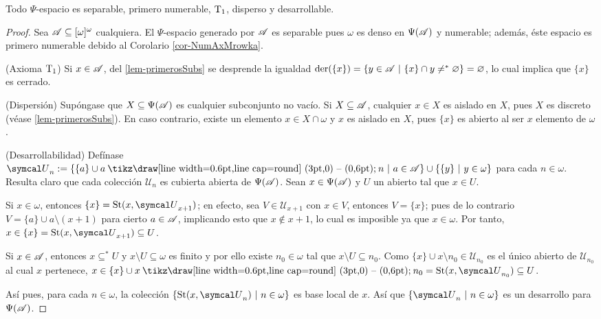  \begin{proposicion}\label{prop-PsiSiempre}
  Todo $\Psi$-espacio es separable, primero numerable, $\operatorname{T}_1$, disperso y desarrollable.
 \end{proposicion}
 
 \begin{proof} 
  Sea $\mathscr{A} \subseteq [\omega]^\omega$ cualquiera. El $\Psi$-espacio generado por $\mathscr{A}$ es separable pues $\omega$ es denso en $\Psi(\mathscr{A})$ y numerable; además, éste espacio es primero numerable debido al Corolario \ref{cor-NumAxMrowka}.
 
  (Axioma $\operatorname{T}_1$) Si $x \in \mathscr{A}$, del \autoref{lem-primerosSubs} se desprende la igualdad $\operatorname{der}(\{x\})=\{y \in \mathscr{A} \text{ $|$ } \{x\} \cap y \neq^* \varnothing \}=\varnothing$, lo cual implica que $\{x\}$ es cerrado.
  
  (Dispersión) Supóngase que $X \subseteq \Psi(\mathscr{A})$ es cualquier subconjunto no vacío. Si $X \subseteq \mathscr{A}$, cualquier $x \in X$ es aislado en $X$, pues $X$ es discreto (véase \ref{lem-primerosSubs}). En caso contrario, existe un elemento $x \in X \cap \omega$ y $x$ es aislado en $X$, pues $\{x\}$ es abierto al ser $x$ elemento de $\omega$.
  
  (Desarrollabilidad) Defínase $\mathcal{U}_n:=\{ \{a\} \cup a \setminus n \tq a \in \ms{A} \} \cup \{ \{y\} \tq y \in \omega \}$ para cada $n \in \omega$. Resulta claro que cada colección $\mathcal{U}_n$ es cubierta abierta de $\Psi(\mathscr{A})$. Sean $x \in \Psi(\mathscr{A})$ y $U$ un abierto tal que $x \in U$.
  
  Si $x \in \omega$, entonces $\{x\} = \St(x, \mathcal{U}_{x+1})$; en efecto, sea $V \in \mathcal{U}_{x+1}$ con $x \in V$, entonces $V=\{x\}$; pues de lo contrario $V =\{a\} \cup a \setminus (x+1)$ para cierto $a \in \mathscr{A}$, implicando esto que $x \notin x+1$, lo cual es imposible ya que $x \in \omega$. Por tanto, $x \in \{x\} = \St(x,\mathcal{U}_{x+1}) \subseteq U$. 
  
  Si $x \in \mathscr{A}$, entonces $x \subseteq^* U$ y $x \setminus U \subseteq \omega$ es finito y por ello existe $n_0 \in \omega$ tal que $x \setminus U \subseteq n_0$. Como $\{x\} \cup x \setminus n_0 \in \mathcal{U}_{n_0}$ es el único abierto de $\mathcal{U}_{n_0}$ al cual $x$ pertenece, $x \in \{x\} \cup x \setminus n_0 = \St(x, \mathcal{U}_{n_0}) \subseteq U$.
  
  Así pues, para cada $n \in \omega$, la colección $\{\St(x, \mathcal{U}_n) \tq n \in \omega\}$ es base local de $x$. Así que $\{\mathcal{U}_n \tq n \in \omega \}$ es un desarrollo para $\Psi(\mathscr{A})$.
 \end{proof}
 
